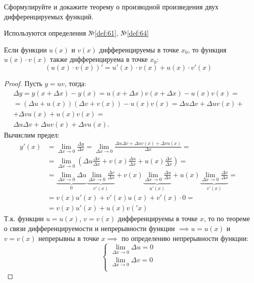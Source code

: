 \begin{question}
    Сформулируйте и докажите теорему о производной произведения двух дифференцируемых функций.
\end{question}
\begin{used}
    Используются определения №\ref{def:61}, №\ref{def:64}
\end{used}
\begin{theorem}
    Если функции $u(x)$ и $v(x)$ дифференцируемы в точке $x_0$, то функция $u(x) \cdot v(x)$ также дифференцируема в точке $x_0$: \[
        (u(x) \cdot v(x))' = u'(x) \cdot v(x) + u(x) \cdot v'(x)
    \]
\end{theorem}
\begin{proof}
    Пусть $y = uv$, тогда:
    \begin{gather*}
        \Delta  y = y(x + \Delta x) - y(x) = u(x + \Delta x) v(x + \Delta x) - u(x) v(x) = \\
        = (\Delta u + u(x))(\Delta v + v(x)) - u(x) v(x) = \Delta u \Delta v + \Delta u v(x) + \\
        + \Delta v u(x) + u(x) v (x) = \\
        \Delta u \Delta v + \Delta u v(x) + \Delta v u(x).
    \end{gather*}
    Вычислим предел:
    \begin{align*}
        y'(x) &= \lim_{\Delta x \to 0} \frac{\Delta y}{\Delta x} 
           = \lim_{\Delta x \to 0}  \frac{ \Delta u \Delta v + \Delta  u v(x) + \Delta v u(x)}{\Delta x} = \\
          &= \lim_{\Delta x \to 0} \left( \Delta u \frac{\Delta v}{\Delta x} + v(x) \frac{\Delta u}{\Delta x} + u(x) \frac{\Delta v}{\Delta x} \right) = \\
          &= \underbrace{\lim_{\Delta x \to 0} \Delta u}_{0} \underbrace{\lim_{\Delta x \to 0} \frac{\Delta v}{\Delta x}}_{v'(x)} + v(x) \underbrace{\lim_{\Delta x \to 0} \frac{\Delta u}{\Delta x}}_{u'(x)} + u(x)\underbrace{\lim_{\Delta x \to 0} \frac{\Delta v}{\Delta x}}_{v'(x)} = \\
          &= v(x) u'(x) + v'(x) u(x) + v'(x) \cdot 0 = \\
          &= \boxed{v(x) u'(x) + u(x) v('x)}
    \end{align*}
    Т.к. функции $u = u(x)$, $v = v(x)$ дифференцируемы в точке $x$, то по теореме о связи дифференцируемости и непрерывности функции  $\implies u = u(x)$ и $v = v(x)$ непрерывны в точке  $x \implies$ по определению непрерывности функции: \[
        \begin{cases}
            \lim_{\Delta x \to 0} \Delta u = 0 \\
            \lim_{\Delta x \to 0} \Delta v = 0 \\
        \end{cases}
    \] 
\end{proof}
\pagebreak



